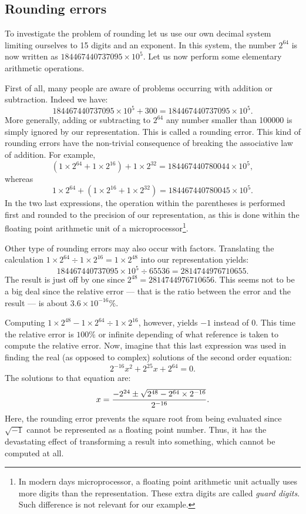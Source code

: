 \documentclass[twoside]{book}
\begin{document}
\subsection{Rounding errors}
\label{sec-rounding} To investigate the problem of rounding let us
use our own decimal system limiting ourselves to 15 digits and an
exponent. In this system, the number $2^{64}$ is now written as
$184467440737095\times10^5$. Let us now perform some elementary
arithmetic operations.
\par
First of all, many people are aware of problems occurring with
addition or subtraction. Indeed we have: $$184467440737095\times
10^5+300 = 184467440737095\times 10^5.$$ More generally, adding or
subtracting to $2^{64}$ any number smaller than 100000 is simply
ignored by our representation. This is called a rounding error.
This kind of rounding errors have the non-trivial consequence of
breaking the associative law of addition. For example, $$\left(1
\times 2^{64}+1 \times 2^{16}\right)+1 \times
2^{32}=184467440780044\times10^5,$$ whereas $$1 \times
2^{64}+\left(1 \times 2^{16}+1 \times
2^{32}\right)=184467440780045\times10^5.$$ In the two last
expressions, the operation within the parentheses is performed
first and rounded to the precision of our representation, as this
is done within the floating point arithmetic unit of a
microprocessor\footnote{In modern days microprocessor, a floating
point arithmetic unit actually uses more digits than the
representation. These extra digits are called {\sl guard digits}.
Such difference is not relevant for our example.}.
\par
Other type of rounding errors may also occur with factors.
Translating the calculation $1 \times 2^{64} \div 1 \times
2^{16}=1 \times 2^{48}$ into our representation yields:
$$184467440737095\times 10^5 \div 65536 = 2814744976710655.$$ The
result is just off by one since $2^{48} = 2814744976710656$. This
seems not to be a big deal since the relative error --- that is
the ratio between the error and the result --- is about $3.6\times
10^{-16}\%$.
\par
Computing $1 \times 2^{48} - 1 \times 2^{64} \div 1 \times
2^{16}$, however, yields $-1$ instead of $0$. This time the
relative error is $100\%$ or infinite depending of what reference
is taken to compute the relative error. Now, imagine that this
last expression was used in finding the real (as opposed to
complex) solutions of the second order equation:
$$2^{-16}x^2+2^{25}x+2^{64}=0.$$ The solutions to that equation
are: $$x={-2^{24}\pm\sqrt{2^{48}-2^{64}\times 2^{-16}}\over
2^{-16}}.$$ Here, the rounding error prevents the square root from
being evaluated since $\sqrt{-1}$ cannot be represented as a
floating point number. Thus, it has the devastating effect of
transforming a result into something, which cannot be computed at
all.
\end{document}
